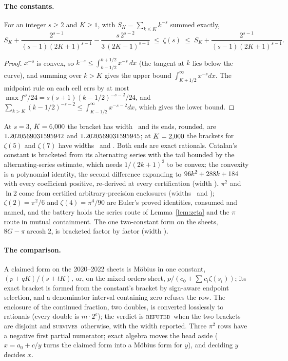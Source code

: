 \documentclass[11pt]{article}
\theoremstyle{definition}
\theoremstyle{plain}
\newcommand{\vS}{\textsc{survives}}
\newcommand{\vR}{\textsc{refuted}}
\begin{document}
\paragraph{The constants.}
\begin{lemma}\label{lem:zeta}
For an integer $s\ge2$ and $K\ge1$, with $S_K=\sum_{k\le K}k^{-s}$ summed exactly,
\[
S_K+\frac{2^{s-1}}{(s-1)(2K+1)^{s-1}}-\frac{s\,2^{s-2}}{3\,(2K-1)^{s+1}}\;\le\;\zeta(s)\;\le\;S_K+\frac{2^{s-1}}{(s-1)(2K+1)^{s-1}} .
\]
\end{lemma}
\begin{proof}
$x^{-s}$ is convex, so $k^{-s}\le\int_{k-1/2}^{k+1/2}x^{-s}\,dx$ (the tangent at $k$ lies below the curve), and summing over $k>K$ gives the upper bound $\int_{K+1/2}^\infty x^{-s}dx$. The midpoint rule on each cell errs by at most $\max f''/24=s(s+1)(k-1/2)^{-s-2}/24$, and $\sum_{k>K}(k-1/2)^{-s-2}\le\int_{K-1/2}^\infty x^{-s-2}dx$, which gives the lower bound.
\end{proof}
At $s=3$, $K=6{,}000$ the bracket has width \ZetaThreeWidth\ and its ends, rounded, are $1.2020569031595942$ and $1.2020569031595945$; at $K=2{,}000$ the brackets for $\zeta(5)$ and $\zeta(7)$ have widths \ZetaFiveWidth\ and \ZetaSevenWidth. Both ends are exact rationals. Catalan's constant is bracketed from its alternating series with the tail bounded by the alternating-series estimate, which needs $1/(2k+1)^2$ to be convex; the convexity is a polynomial identity, the second difference expanding to $96k^2+288k+184$ with every coefficient positive, re-derived at every certification (width \CatalanWidth). $\pi^2$ and $\ln2$ come from certified arbitrary-precision enclosures (widths \PiSqWidth\ and \LnTwoWidth); $\zeta(2)=\pi^2/6$ and $\zeta(4)=\pi^4/90$ are Euler's proved identities, consumed and named, and the battery holds the series route of Lemma~\ref{lem:zeta} and the $\pi$ route in mutual containment. The one two-constant form on the sheets, $8G-\pi\operatorname{arcosh}2$, is bracketed factor by factor (width \CatalanEWidth).

\paragraph{The comparison.}
A claimed form on the 2020--2022 sheets is M\"obius in one constant, $(p+qK)/(s+tK)$, or, on the mixed-orders sheet, $p/(c_0+\sum c_i\zeta(s_i))$; its exact bracket is formed from the constant's bracket by sign-aware endpoint selection, and a denominator interval containing zero refuses the row. The enclosure of the continued fraction, two doubles, is converted losslessly to rationals (every double is $m\cdot2^e$); the verdict is \vR\ when the two brackets are disjoint and \vS\ otherwise, with the width reported. Three $\pi^2$ rows have a negative first partial numerator; exact algebra moves the head aside ($x=a_0+c/y$ turns the claimed form into a M\"obius form for $y$), and deciding $y$ decides $x$.
\end{document}
